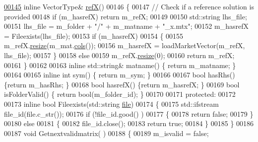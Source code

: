 \begin{DoxyCode}
\hyperlink{class_eigen_1_1_matrix_market_iterator_a80f334d9fbbed0d24ba0c32d2bea16bc}{00145}     \textcolor{keyword}{inline} VectorType& \hyperlink{class_eigen_1_1_matrix_market_iterator_a80f334d9fbbed0d24ba0c32d2bea16bc}{refX}() 
00146     \{ 
00147       \textcolor{comment}{// Check if a reference solution is provided}
00148       \textcolor{keywordflow}{if} (m\_hasrefX) \textcolor{keywordflow}{return} m\_refX;
00149       
00150       std::string lhs\_file;
00151       lhs\_file = m\_folder + \textcolor{stringliteral}{"/"} + m\_matname + \textcolor{stringliteral}{"\_x.mtx"}; 
00152       m\_hasrefX = Fileexists(lhs\_file);
00153       \textcolor{keywordflow}{if} (m\_hasrefX)
00154       \{
00155         m\_refX.\hyperlink{class_eigen_1_1_plain_object_base_a99d9054ee2d5a40c6e00ded0265e9cea}{resize}(m\_mat.\hyperlink{group___sparse_core___module_aa391750e3c530227e4a5c3c52e959975}{cols}());
00156         m\_hasrefX = loadMarketVector(m\_refX, lhs\_file);
00157       \}
00158       \textcolor{keywordflow}{else}
00159         m\_refX.\hyperlink{class_eigen_1_1_plain_object_base_a99d9054ee2d5a40c6e00ded0265e9cea}{resize}(0);
00160       \textcolor{keywordflow}{return} m\_refX; 
00161     \}
00162     
00163     \textcolor{keyword}{inline} std::string& matname() \{ \textcolor{keywordflow}{return} m\_matname; \}
00164     
00165     \textcolor{keyword}{inline} \textcolor{keywordtype}{int} sym() \{ \textcolor{keywordflow}{return} m\_sym; \}
00166     
00167     \textcolor{keywordtype}{bool} hasRhs() \{\textcolor{keywordflow}{return} m\_hasRhs; \}
00168     \textcolor{keywordtype}{bool} hasrefX() \{\textcolor{keywordflow}{return} m\_hasrefX; \}
00169     \textcolor{keywordtype}{bool} isFolderValid() \{ \textcolor{keywordflow}{return} bool(m\_folder\_id); \}
00170     
00171   \textcolor{keyword}{protected}:
00172     
00173     \textcolor{keyword}{inline} \textcolor{keywordtype}{bool} Fileexists(std::string \hyperlink{structfile}{file})
00174     \{
00175       std::ifstream file\_id(file.c\_str());
00176       \textcolor{keywordflow}{if} (!file\_id.good() ) 
00177       \{
00178         \textcolor{keywordflow}{return} \textcolor{keyword}{false};
00179       \}
00180       \textcolor{keywordflow}{else} 
00181       \{
00182         file\_id.close();
00183         \textcolor{keywordflow}{return} \textcolor{keyword}{true};
00184       \}
00185     \}
00186     
00187     \textcolor{keywordtype}{void} Getnextvalidmatrix( )
00188     \{
00189       m\_isvalid = \textcolor{keyword}{false};

\end{DoxyCode}

